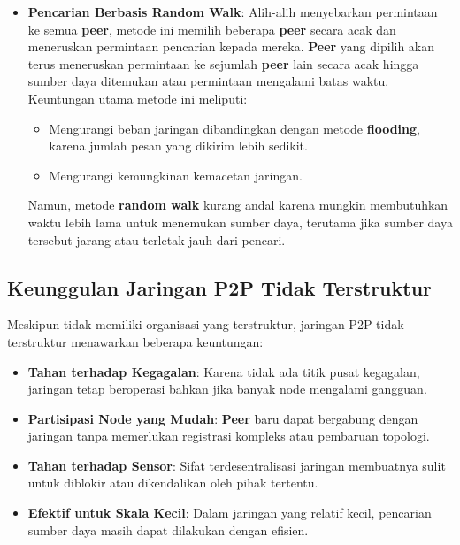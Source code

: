 \begin{itemize}
\begin{itemize}
		\item \textbf{Pencarian Berbasis Random Walk}: Alih-alih menyebarkan permintaan ke semua \textbf{peer}, metode ini memilih beberapa \textbf{peer} secara acak dan meneruskan permintaan pencarian kepada mereka. \textbf{Peer} yang dipilih akan terus meneruskan permintaan ke sejumlah \textbf{peer} lain secara acak hingga sumber daya ditemukan atau permintaan mengalami batas waktu. Keuntungan utama metode ini meliputi:
		\begin{itemize}
			\item Mengurangi beban jaringan dibandingkan dengan metode \textbf{flooding}, karena jumlah pesan yang dikirim lebih sedikit.
			\item Mengurangi kemungkinan kemacetan jaringan.
		\end{itemize}
		Namun, metode \textbf{random walk} kurang andal karena mungkin membutuhkan waktu lebih lama untuk menemukan sumber daya, terutama jika sumber daya tersebut jarang atau terletak jauh dari pencari.
	\end{itemize}
\end{itemize}

\subsection{Keunggulan Jaringan P2P Tidak Terstruktur}
Meskipun tidak memiliki organisasi yang terstruktur, jaringan P2P tidak terstruktur menawarkan beberapa keuntungan:
\begin{itemize}
	\item \textbf{Tahan terhadap Kegagalan}: Karena tidak ada titik pusat kegagalan, jaringan tetap beroperasi bahkan jika banyak node mengalami gangguan.
	\item \textbf{Partisipasi Node yang Mudah}: \textbf{Peer} baru dapat bergabung dengan jaringan tanpa memerlukan registrasi kompleks atau pembaruan topologi.
	\item \textbf{Tahan terhadap Sensor}: Sifat terdesentralisasi jaringan membuatnya sulit untuk diblokir atau dikendalikan oleh pihak tertentu.
	\item \textbf{Efektif untuk Skala Kecil}: Dalam jaringan yang relatif kecil, pencarian sumber daya masih dapat dilakukan dengan efisien.
\end{itemize}

